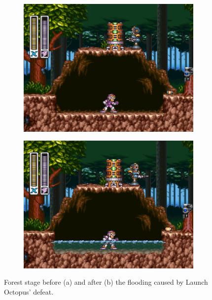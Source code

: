 \begin{figure}[htp]
	\centering
	\begin{subfigure}{0.4\linewidth}
		\centering
		\includegraphics[width=\linewidth]{figures/X1/Sting_chameleon/Sting_no_water.jpg}
		\caption{}
	\end{subfigure}
	\begin{subfigure}{0.4\linewidth}
		\centering
		\includegraphics[width=\linewidth]{figures/X1/Sting_chameleon/Sting_water.jpg}
		\caption{}
	\end{subfigure}
	\caption{Forest stage before (a) and after (b) the flooding caused by Launch Octopus' defeat.}
\end{figure}

